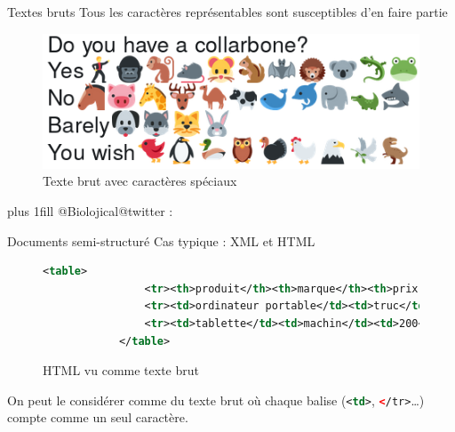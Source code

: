 \documentclass[hyperref={unicode}, xcolor={svgnames}, french]{beamer}
\begin{document}
\begin{frame}{Textes bruts}
    \alert{Tous} les caractères représentables sont susceptibles d'en faire partie
    \begin{figure}
        \includegraphics[width=\textwidth, height=0.8\textheight, keepaspectratio]{pics/raw_emoji.png}
        \caption{Texte brut avec caractères spéciaux}
    \end{figure}
    \vskip0pt plus 1fill
    {\tiny @Biolojical@twitter : }
\end{frame}

\begin{frame}[fragile=singleslide]{Documents semi-structuré}
    Cas typique : XML et HTML
    \begin{figure}
        \begin{lstlisting}[gobble=12, language=XML]
            <table>
                <tr><th>produit</th><th>marque</th><th>prix en euros</th></tr>
                <tr><td>ordinateur portable</td><td>truc</td><td>800</td></tr>
                <tr><td>tablette</td><td>machin</td><td>200</td></tr>
            </table>
        \end{lstlisting}
        \caption{HTML vu comme texte brut}
    \end{figure}
    On peut le considérer comme du texte brut où chaque balise (\lstinline[language=XML]{<td>}, \lstinline[language=XML]{</tr>}…) compte comme un seul caractère.
\end{frame}
\end{document}

